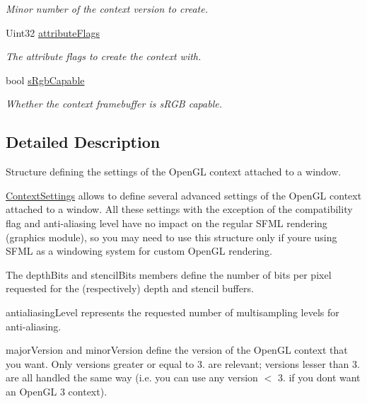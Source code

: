 \begin{DoxyCompactItemize}
\begin{DoxyCompactList}\small\item\em Minor number of the context version to create. \end{DoxyCompactList}\item 
\mbox{\label{structsf_1_1_context_settings_a0ef3fc53802bc0197d2739466915ada5}} 
Uint32 \hyperlink{structsf_1_1_context_settings_a0ef3fc53802bc0197d2739466915ada5}{attribute\+Flags}
\begin{DoxyCompactList}\small\item\em The attribute flags to create the context with. \end{DoxyCompactList}\item 
\mbox{\label{structsf_1_1_context_settings_ac93b041bfb6cbd36034997797708a0a3}} 
bool \hyperlink{structsf_1_1_context_settings_ac93b041bfb6cbd36034997797708a0a3}{s\+Rgb\+Capable}
\begin{DoxyCompactList}\small\item\em Whether the context framebuffer is s\+R\+GB capable. \end{DoxyCompactList}\end{DoxyCompactItemize}


\subsection{Detailed Description}
Structure defining the settings of the Open\+GL context attached to a window. 

\hyperlink{structsf_1_1_context_settings}{Context\+Settings} allows to define several advanced settings of the Open\+GL context attached to a window. All these settings with the exception of the compatibility flag and anti-\/aliasing level have no impact on the regular S\+F\+ML rendering (graphics module), so you may need to use this structure only if you\textquotesingle{}re using S\+F\+ML as a windowing system for custom Open\+GL rendering.

The depth\+Bits and stencil\+Bits members define the number of bits per pixel requested for the (respectively) depth and stencil buffers.

antialiasing\+Level represents the requested number of multisampling levels for anti-\/aliasing.

major\+Version and minor\+Version define the version of the Open\+GL context that you want. Only versions greater or equal to 3. are relevant; versions lesser than 3. are all handled the same way (i.\+e. you can use any version $<$ 3. if you don\textquotesingle{}t want an Open\+GL 3 context).

